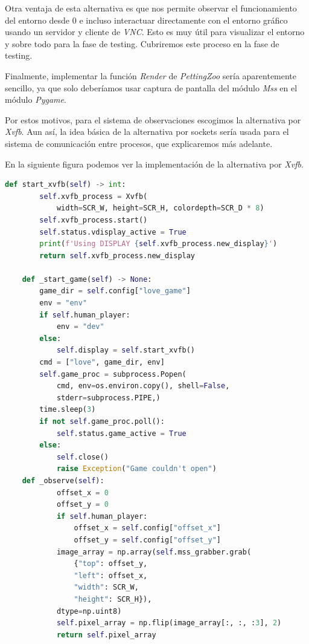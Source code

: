 Otra ventaja de esta alternativa es que nos permite observar el funcionamiento del entorno desde 0 e incluso interactuar directamente con el entorno gráfico usando un servidor y cliente de \textit{VNC}. Esto es muy útil para visualizar el entorno y sobre todo para la fase de testing. Cubriremos este proceso en la fase de testing.

Finalmente, implementar la función \textit{Render} de \textit{PettingZoo} sería aparentemente sencillo, ya que solo deberíamos usar captura de pantalla del módulo \textit{Mss} en el módulo \textit{Pygame}.

Por estos motivos, para el sistema de observaciones escogimos la alternativa por \textit{Xvfb}. Aun así, la idea básica de la alternativa por sockets sería usada para el sistema de comunicación entre procesos, que explicaremos más adelante. 

En la siguiente figura podemos ver la implementación de la alternativa por \textit{Xvfb}.

\begin{lstlisting}[language=Python]
    def start_xvfb(self) -> int:
        self.xvfb_process = Xvfb(
            width=SCR_W, height=SCR_H, colordepth=SCR_D * 8)
        self.xvfb_process.start()
        self.status.vdisplay_active = True
        print(f'Using DISPLAY {self.xvfb_process.new_display}')
        return self.xvfb_process.new_display

    def _start_game(self) -> None:
        game_dir = self.config["love_game"]
        env = "env"
        if self.human_player:
            env = "dev"
        else:
            self.display = self.start_xvfb()
        cmd = ["love", game_dir, env]
        self.game_proc = subprocess.Popen(
            cmd, env=os.environ.copy(), shell=False,
            stderr=subprocess.PIPE,)
        time.sleep(3)
        if not self.game_proc.poll(): 
            self.status.game_active = True
        else:
            self.close()
            raise Exception("Game couldn't open")
    def _observe(self):
            offset_x = 0
            offset_y = 0
            if self.human_player:
                offset_x = self.config["offset_x"]
                offset_y = self.config["offset_y"]
            image_array = np.array(self.mss_grabber.grab(
                {"top": offset_y,
                "left": offset_x,
                "width": SCR_W,
                "height": SCR_H}),
            dtype=np.uint8)
            self.pixel_array = np.flip(image_array[:, :, :3], 2)
            return self.pixel_array
\end{lstlisting}

